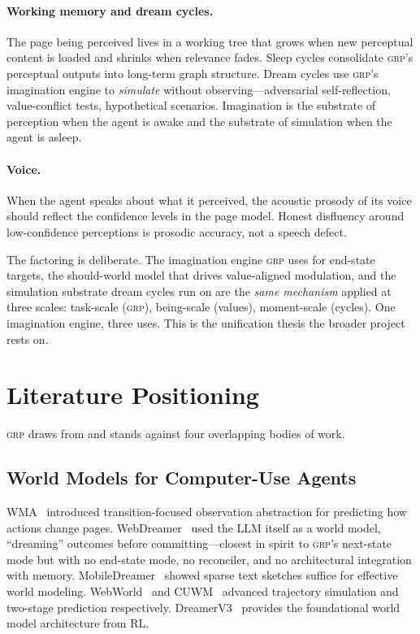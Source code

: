 \documentclass[12pt]{article}
\theoremstyle{definition}
\theoremstyle{remark}
\newcommand{\grp}{\textsc{grp}}
\begin{document}
\paragraph{Working memory and dream cycles.}
The page being perceived lives in a working tree that grows when new
perceptual content is loaded and shrinks when relevance fades. Sleep
cycles consolidate \grp{}'s perceptual outputs into long-term graph
structure. Dream cycles use \grp{}'s imagination engine to
\emph{simulate} without observing---adversarial self-reflection,
value-conflict tests, hypothetical scenarios. Imagination is the
substrate of perception when the agent is awake and the substrate of
simulation when the agent is asleep.

\paragraph{Voice.}
When the agent speaks about what it perceived, the acoustic prosody
of its voice should reflect the confidence levels in the page model.
Honest disfluency around low-confidence perceptions is prosodic
accuracy, not a speech defect.

\bigskip
\noindent
The factoring is deliberate. The imagination engine \grp{} uses for
end-state targets, the should-world model that drives value-aligned
modulation, and the simulation substrate dream cycles run on are the
\emph{same mechanism} applied at three scales: task-scale (\grp{}),
being-scale (values), moment-scale (cycles). One imagination engine,
three uses. This is the unification thesis the broader project rests
on.

\section{Literature Positioning}
\label{sec:literature}

\grp{} draws from and stands against four overlapping bodies of work.

\subsection{World Models for Computer-Use Agents}
WMA~\cite{wma} introduced transition-focused observation abstraction
for predicting how actions change pages.
WebDreamer~\cite{webdreamer} used the LLM itself as a world model,
``dreaming'' outcomes before committing---closest in spirit to
\grp{}'s next-state mode but with no end-state mode, no reconciler,
and no architectural integration with memory.
MobileDreamer~\cite{mobiledreamer} showed sparse text sketches
suffice for effective world modeling.
WebWorld~\cite{webworld} and CUWM~\cite{cuwm} advanced trajectory
simulation and two-stage prediction respectively.
DreamerV3~\cite{dreamerv3} provides the foundational world model
architecture from RL.
\end{document}
